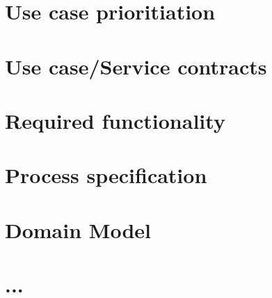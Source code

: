 \documentclass[a4paper,12pt]{report}
\begin{document}
\section{Use case prioritiation}
\section{Use case/Service contracts}
\section{Required functionality}
\section{Process specification}
\section{Domain Model}





\newpage
\section{...}

{} %

\end{document}
